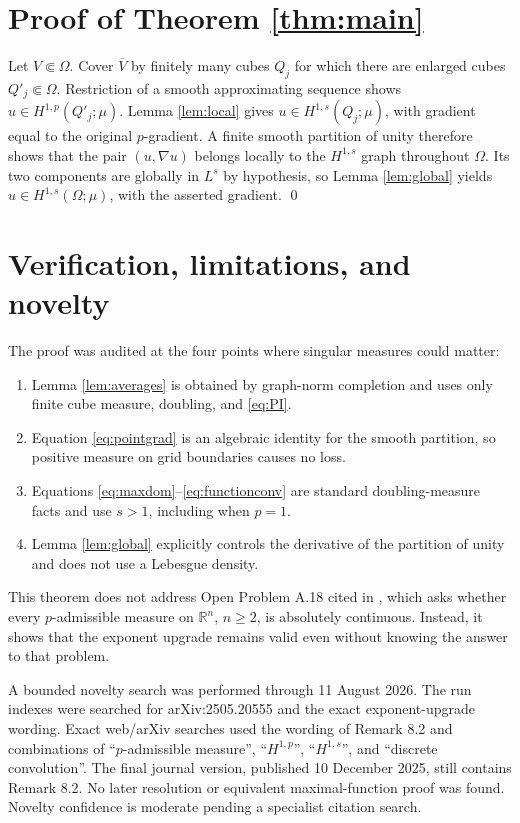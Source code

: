 \documentclass[11pt]{article}
\newcommand{\R}{\mathbb R}
\begin{document}
\section{Proof of Theorem \ref{thm:main}}

Let \(V\Subset\Omega\).  Cover \(\overline V\) by finitely many cubes
\(Q_j\) for which there are enlarged cubes \(Q'_j\Subset\Omega\).
Restriction of a smooth approximating sequence shows
\(u\in H^{1,p}(Q'_j;\mu)\).  Lemma \ref{lem:local} gives
\(u\in H^{1,s}(Q_j;\mu)\), with gradient equal to the original
\(p\)-gradient.  A finite smooth partition of unity therefore shows that the
pair \((u,\nabla u)\) belongs locally to the \(H^{1,s}\) graph throughout
\(\Omega\).  Its two components are globally in \(L^s\) by hypothesis, so
Lemma \ref{lem:global} yields \(u\in H^{1,s}(\Omega;\mu)\), with the asserted
gradient. \qed

\section{Verification, limitations, and novelty}

The proof was audited at the four points where singular measures could matter:
\begin{enumerate}[leftmargin=*]
\item Lemma \ref{lem:averages} is obtained by graph-norm completion and uses
only finite cube measure, doubling, and \eqref{eq:PI}.
\item Equation \eqref{eq:pointgrad} is an algebraic identity for the smooth
partition, so positive measure on grid boundaries causes no loss.
\item Equations \eqref{eq:maxdom}--\eqref{eq:functionconv} are standard
doubling-measure facts and use \(s>1\), including when \(p=1\).
\item Lemma \ref{lem:global} explicitly controls the derivative of the
partition of unity and does not use a Lebesgue density.
\end{enumerate}

This theorem does not address Open Problem A.18 cited in \cite{EM}, which asks
whether every \(p\)-admissible measure on \(\R^n\), \(n\ge2\), is absolutely
continuous.  Instead, it shows that the exponent upgrade remains valid even
without knowing the answer to that problem.

A bounded novelty search was performed through 11 August 2026.  The run
indexes were searched for arXiv:2505.20555 and the exact exponent-upgrade
wording.  Exact web/arXiv searches used the wording of Remark 8.2 and
combinations of ``\(p\)-admissible measure'', ``\(H^{1,p}\)'',
``\(H^{1,s}\)'', and ``discrete convolution''.  The final journal version,
published 10 December 2025, still contains Remark 8.2.  No later resolution or
equivalent maximal-function proof was found.  Novelty confidence is moderate
pending a specialist citation search.
\end{document}
